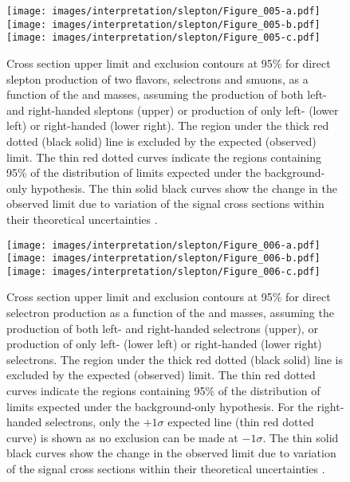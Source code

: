 \begin{figure}[htbp]
\centering
\texttt{[image: images/interpretation/slepton/Figure\_005-a.pdf]} \\
\texttt{[image: images/interpretation/slepton/Figure\_005-b.pdf]}
\texttt{[image: images/interpretation/slepton/Figure\_005-c.pdf]}
\caption{\label{fig:TOT}
Cross section upper limit and exclusion contours at 95\% \CL for direct slepton production of two flavors, selectrons and smuons,
as a function of the \lsp and \slep masses, assuming the production of both left- and right-handed sleptons
(upper) or production of only left- (lower left) or right-handed (lower right).
The region under the thick red dotted (black solid) line is excluded by the expected (observed) limit.
The thin red dotted curves indicate the regions containing 95\% of the distribution of limits
expected under the background-only hypothesis.
The thin solid black curves show the change in the observed limit due to
variation of the signal cross sections within their theoretical uncertainties \cite{Sirunyan:2018nwe}.}
\end{figure}
\begin{figure}[htbp]
\centering
\texttt{[image: images/interpretation/slepton/Figure\_006-a.pdf]} \\
\texttt{[image: images/interpretation/slepton/Figure\_006-b.pdf]}
\texttt{[image: images/interpretation/slepton/Figure\_006-c.pdf]}
\caption{\label{fig:TOTee}
Cross section upper limit and exclusion contours at 95\% \CL for direct selectron production
as a function of the \lsp and \slep masses, assuming the production of both left- and right-handed selectrons
(upper), or production of only left- (lower left) or right-handed (lower right) selectrons.
The region under the thick red dotted (black solid) line is excluded by the expected (observed) limit.
The thin red dotted curves indicate the regions containing 95\% of the distribution of limits
expected under the background-only hypothesis. For the right-handed selectrons, only the $+1\sigma$ expected line (thin red dotted curve) is shown as no exclusion can be made at $-1\sigma$.
The thin solid black curves show the change in the observed limit due to
variation of the signal cross sections within their theoretical uncertainties \cite{Sirunyan:2018nwe}.}
\end{figure}
